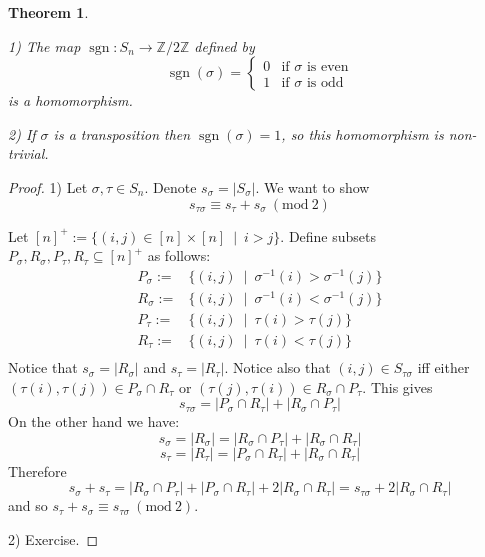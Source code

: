 \documentclass[12pt, letterpaper, oneside]{article}
\theoremstyle{plain}
\newtheorem{theorem}{Theorem}[section]
\theoremstyle{definition}
\newcommand{\Z}{{\mathbb Z}}
\newcommand{\sgn}{\operatorname{sgn}}
\newcommand{\vs}{\vskip 5mm}
\begin{document}
\vs\vs

\begin{theorem}
\label{THM_PERMSIGN}

1) The map $\sgn\colon S_{n}\to \Z/2\Z$ defined by 
$$
\sgn(\sigma) = 
\begin{cases}
0 & \text{if $\sigma$ is even} \\
1 & \text{if $\sigma$ is odd}
\end{cases}
$$
is a homomorphism. 

2) If $\sigma$ is a transposition then $\sgn(\sigma) =1$, 
so this homomorphism is non-trivial.
\end{theorem}

\vs

\begin{proof}
1) Let $\sigma, \tau\in S_{n}$. Denote $s_{\sigma} = |S_{\sigma}|$. 
We want to show
$$s_{\tau\sigma} \equiv s_{\tau} + s_{\sigma} \ (\mathrm{mod} \ 2) $$

Let $[n]^{+} := \{ (i, j) \in [n]\times [n] \ \mid \ i> j \}$. Define subsets
$P_{\sigma}, R_{\sigma}, P_{\tau}, R_{\tau}\subseteq [n]^{+}$ as follows:
\begin{align*}
P_{\sigma} :=  & \{(i, j) \ \mid \ \sigma^{-1}(i) > \sigma^{-1}(j)\} \\
R_{\sigma} :=  & \{(i, j) \ \mid \ \sigma^{-1}(i) < \sigma^{-1}(j)\} \\
P_{\tau} :=  & \{(i, j) \ \mid \ \tau(i) > \tau(j)\} \\
R_{\tau} :=  & \{(i, j) \ \mid \ \tau(i) < \tau(j)\} \\
\end{align*}
Notice that $s_{\sigma} = |R_{\sigma}|$ and $s_{\tau} = |R_{\tau}|$. Notice also 
that $(i, j)\in S_{\tau\sigma}$ iff either $(\tau(i), \tau(j)) \in P_{\sigma}\cap R_{\tau}$
or $(\tau(j), \tau(i)) \in R_{\sigma} \cap P_{\tau}$. This gives
$$s_{\tau\sigma} = |P_{\sigma}\cap R_{\tau}| + | R_{\sigma} \cap P_{\tau}|$$
On the other hand we have:
$$s_{\sigma} = |R_{\sigma}| = |R_{\sigma}\cap P_{\tau}| + |R_{\sigma}\cap R_{\tau}|$$
$$s_{\tau} = |R_{\tau}| = |P_{\sigma}\cap R_{\tau}| + |R_{\sigma}\cap R_{\tau}|$$
Therefore 
$$s_{\sigma} + s_{\tau} =  |R_{\sigma}\cap P_{\tau}| +  |P_{\sigma}\cap R_{\tau}| + 
2|R_{\sigma}\cap R_{\tau}| = s_{\tau\sigma} + 2|R_{\sigma}\cap R_{\tau}|$$
and so  $s_{\tau} + s_{\sigma} \equiv  s_{\tau\sigma} \ (\mathrm{mod} \ 2) $.

\vs

2) Exercise.
\end{proof}
\end{document}
